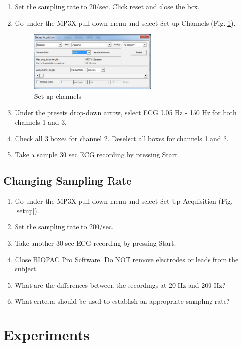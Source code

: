 \documentclass{article}
\begin{document}
\begin{enumerate}
	\item Set the sampling rate to 20/sec. Click reset and close the box.
	\item Go under the MP3X pull-down menu and select Set-up Channels (Fig. \ref{setup_2}).
	\begin{figure}[h]
	\centering\includegraphics[width=0.6\textwidth]{../images/ECG_I_4.jpg}
	\caption{Set-up channels}
	\label{setup_2}
	\end{figure}
	
	\item Under the presets drop-down arrow, select ECG 0.05 Hz - 150 Hz for both channels 1 and 3.
	\item Check all 3 boxes for channel 2. Deselect all boxes for channels 1 and 3.
	\item Take a sample 30 sec ECG recording by pressing Start.
\end{enumerate}

\subsection*{Changing Sampling Rate}
\begin{enumerate}
	\item Go under the MP3X pull-down menu and select Set-Up Acquisition (Fig. \ref{setup}).
	\item Set the sampling rate to 200/sec.
	\item Take another 30 sec ECG recording by pressing Start.
	\item Close BIOPAC Pro Software. Do NOT remove electrodes or leads from the subject.
	\item What are the differences between the recordings at 20 Hz and 200 Hz?
	\item What criteria should be used to establish an appropriate sampling rate?
\end{enumerate}

\section*{Experiments}
\end{document}
